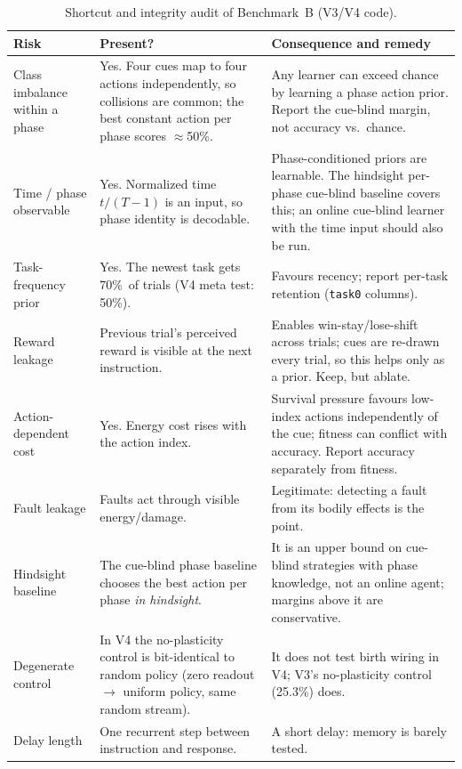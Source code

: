 \documentclass[11pt]{article}
\theoremstyle{remark}
\newcommand{\pct}{\%}
\begin{document}
\begin{table}[t]
\centering\small
\caption{Shortcut and integrity audit of Benchmark~B (V3/V4 code).}
\label{tab:integrity}
\begin{tabularx}{\linewidth}{>{\raggedright\arraybackslash}p{3.3cm}>{\raggedright\arraybackslash}p{4.2cm}X}
\toprule
Risk & Present? & Consequence and remedy \\
\midrule
Class imbalance within a phase & Yes. Four cues map to four actions independently, so collisions are common;
the best constant action per phase scores $\approx$50\pct. & Any learner can exceed chance by learning a phase
action prior. Report the cue-blind margin, not accuracy vs.\ chance. \\
Time / phase observable & Yes. Normalized time $t/(T-1)$ is an input, so phase identity is decodable. &
Phase-conditioned priors are learnable. The hindsight per-phase cue-blind baseline covers this; an online
cue-blind learner with the time input should also be run. \\
Task-frequency prior & Yes. The newest task gets 70\pct\ of trials (V4 meta test: 50\pct). & Favours recency;
report per-task retention (\texttt{task0} columns). \\
Reward leakage & Previous trial's perceived reward is visible at the next instruction. & Enables
win-stay/lose-shift across trials; cues are re-drawn every trial, so this helps only as a prior. Keep, but
ablate. \\
Action-dependent cost & Yes. Energy cost rises with the action index. & Survival pressure favours low-index
actions independently of the cue; fitness can conflict with accuracy. Report accuracy separately from fitness. \\
Fault leakage & Faults act through visible energy/damage. & Legitimate: detecting a fault from its bodily
effects is the point. \\
Hindsight baseline & The cue-blind phase baseline chooses the best action per phase \emph{in hindsight}. & It is
an upper bound on cue-blind strategies with phase knowledge, not an online agent; margins above it are
conservative. \\
Degenerate control & In V4 the no-plasticity control is bit-identical to random policy (zero readout $\to$
uniform policy, same random stream). & It does not test birth wiring in V4; V3's no-plasticity control (25.3\pct)
does. \\
Delay length & One recurrent step between instruction and response. & A short delay: memory is barely tested. \\
\bottomrule
\end{tabularx}
\end{table}
\end{document}
